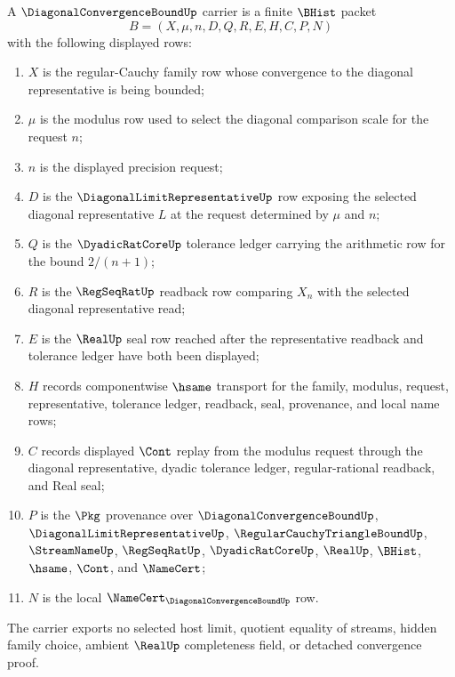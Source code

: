 \begin{definition}
\label{def:diagonal-convergence-bound-carrier}
A $\DiagonalConvergenceBoundUp$ carrier is a finite $\BHist$ packet
$$
B=(X,\mu,n,D,Q,R,E,H,C,P,N)
$$
with the following displayed rows:
\begin{enumerate}
\item $X$ is the regular-Cauchy family row whose convergence to the diagonal representative is being bounded;
\item $\mu$ is the modulus row used to select the diagonal comparison scale for the request $n$;
\item $n$ is the displayed precision request;
\item $D$ is the $\DiagonalLimitRepresentativeUp$ row exposing the selected diagonal representative $L$ at the request determined by $\mu$ and $n$;
\item $Q$ is the $\DyadicRatCoreUp$ tolerance ledger carrying the arithmetic row for the bound $2/(n+1)$;
\item $R$ is the $\RegSeqRatUp$ readback row comparing $X_n$ with the selected diagonal representative read;
\item $E$ is the $\RealUp$ seal row reached after the representative readback and tolerance ledger have both been displayed;
\item $H$ records componentwise $\hsame$ transport for the family, modulus, request, representative, tolerance ledger, readback, seal, provenance, and local name rows;
\item $C$ records displayed $\Cont$ replay from the modulus request through the diagonal representative, dyadic tolerance ledger, regular-rational readback, and Real seal;
\item $P$ is the $\Pkg$ provenance over $\DiagonalConvergenceBoundUp$, $\DiagonalLimitRepresentativeUp$, $\RegularCauchyTriangleBoundUp$, $\StreamNameUp$, $\RegSeqRatUp$, $\DyadicRatCoreUp$, $\RealUp$, $\BHist$, $\hsame$, $\Cont$, and $\NameCert$;
\item $N$ is the local $\NameCert_{\DiagonalConvergenceBoundUp}$ row.
\end{enumerate}
The carrier exports no selected host limit, quotient equality of streams, hidden family choice, ambient $\RealUp$ completeness field, or detached convergence proof.
\end{definition}


